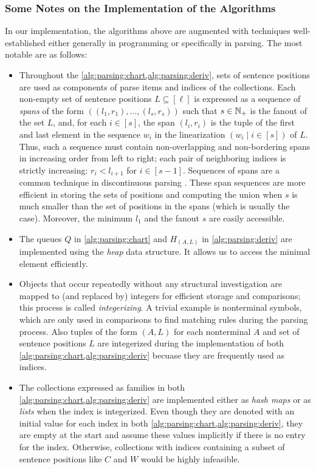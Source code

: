 \documentclass[../../document.tex]{subfiles}
\begin{document}
    \subsubsection*{Some Notes on the Implementation of the Algorithms}
    In our implementation, the algorithms above are augmented with techniques well-established either generally in programming or specifically in parsing.
    The most notable are as follows:
    \begin{itemize}
        \item Throughout the \cref{alg:parsing:chart,alg:parsing:deriv}, sets of sentence positions are used as components of parse items and indices of the collections.
            Each non-empty set of sentence positions \(L \subseteq [\ell]\) is expressed as a sequence of \emph{spans} of the form \(((l_1, r_1), \ldots, (l_s, r_s))\) such that \(s\in \mathbb{N}_+\) is the fanout of the set \(L\), and, for each \(i \in [s]\), the span \((l_i, r_i)\) is the tuple of the first and last element in the sequence \(w_i\) in the linearization \((w_i \mid i \in [s])\) of \(L\).
            Thus, such a sequence must contain non-overlapping and non-bordering spans in increasing order from left to right; each pair of neighboring indices is strictly increasing: \(r_i < l_{i+1}\) for \(i \in [s-1]\).
            Sequences of spans are a common technique in discontinuous parsing \citep[e.g.][cf.\@ range vector in Definition~6.6]{Kal10}.
            These span sequences are more efficient in storing the sets of positions and computing the union when \(s\) is much smaller than the set of positions in the spans (which is usually the case).
            Moreover, the minimum \(l_1\) and the fanout \(s\) are easily accessible.
        \item The queues \(Q\) in \cref{alg:parsing:chart} and \(H_{(A,L)}\) in \cref{alg:parsing:deriv} are implemented using the \emph{heap} data structure.
            It allows us to access the minimal element efficiently.
        \item Objects that occur repeatedly without any structural investigation are mapped to (and replaced by) integers for efficient storage and comparisons; this process is called \emph{integerizing}.
            A trivial example is nonterminal symbols, which are only used in comparisons to find matching rules during the parsing process.
            Also tuples of the form \((A, L)\) for each nonterminal \(A\) and set of sentence positions \(L\) are integerized during the implementation of both \cref{alg:parsing:chart,alg:parsing:deriv} becuase they are frequently used as indices.
        \item The collections expressed as families in both \cref{alg:parsing:chart,alg:parsing:deriv} are implemented either as \emph{hash maps} or as \emph{lists} when the index is integerized.
            Even though they are denoted with an initial value for each index in both \cref{alg:parsing:chart,alg:parsing:deriv}, they are empty at the start and assume these values implicitly if there is no entry for the index.
            Otherwise, collections with indices containing a subset of sentence positions like \(C\) and \(W\) would be highly infeasible.
    \end{itemize}
\end{document}
